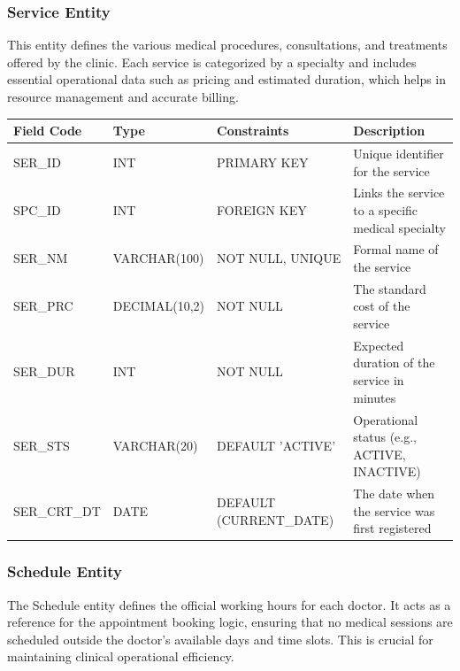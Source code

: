 \subsubsection{Service Entity}
This entity defines the various medical procedures, consultations, and treatments offered by the clinic. Each service is categorized by a specialty and includes essential operational data such as pricing and estimated duration, which helps in resource management and accurate billing.

\begin{table}[H]
	\centering
	\small
	\renewcommand{\arraystretch}{1.4}
	\begin{tabularx}{\textwidth}{l l l X}
		\toprule
		\rowcolor[gray]{0.9} \textbf{Field Code} & \textbf{Type} & \textbf{Constraints} & \textbf{Description} \\
		\midrule
		SER\_ID & INT & PRIMARY KEY & Unique identifier for the service \\
		SPC\_ID & INT & FOREIGN KEY & Links the service to a specific medical specialty \\
		SER\_NM & VARCHAR(100) & NOT NULL, UNIQUE & Formal name of the service \\
		SER\_PRC & DECIMAL(10,2) & NOT NULL & The standard cost of the service \\
		SER\_DUR & INT & NOT NULL & Expected duration of the service in minutes \\
		SER\_STS & VARCHAR(20) & DEFAULT 'ACTIVE' & Operational status (e.g., ACTIVE, INACTIVE) \\
		SER\_CRT\_DT & DATE & DEFAULT (CURRENT\_DATE) & The date when the service was first registered \\
		\bottomrule
	\end{tabularx}
\end{table}
\subsubsection{Schedule Entity}
The Schedule entity defines the official working hours for each doctor. It acts as a reference for the appointment booking logic, ensuring that no medical sessions are scheduled outside the doctor’s available days and time slots. This is crucial for maintaining clinical operational efficiency.

